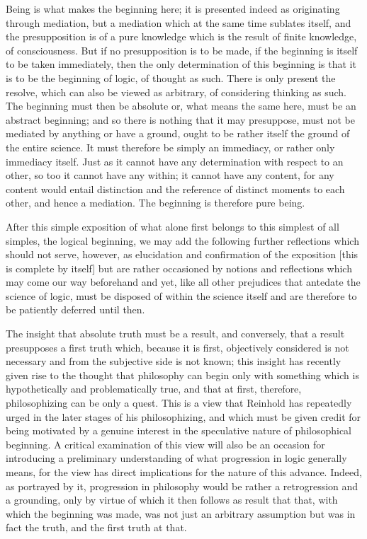 Being is what makes the beginning here;
it is presented indeed as originating through mediation,
but a mediation which at the same time sublates itself,
and the presupposition is of a pure knowledge
which is the result of finite knowledge, of consciousness.
But if no presupposition is to be made,
if the beginning is itself to be taken immediately,
then the only determination of this beginning is
that it is to be the beginning of logic, of thought as such.
There is only present the resolve,
which can also be viewed as arbitrary,
of considering thinking as such.
The beginning must then be absolute
or, what means the same here, must be an abstract beginning;
and so there is nothing that it may presuppose,
must not be mediated by anything or have a ground,
ought to be rather itself the ground of the entire science.
It must therefore be simply an immediacy,
or rather only immediacy itself.
Just as it cannot have any determination with respect to an other,
so too it cannot have any within;
it cannot have any content, for any content would entail distinction
and the reference of distinct moments to each other,
and hence a mediation.
The beginning is therefore pure being.

After this simple exposition of what alone first belongs to
this simplest of all simples, the logical beginning,
we may add the following further reflections which should not serve,
however, as elucidation and confirmation of the exposition
[this is complete by itself]
but are rather occasioned by notions and reflections
which may come our way beforehand and yet,
like all other prejudices that antedate the science of logic,
must be disposed of within the science itself
and are therefore to be patiently deferred until then.

The insight that absolute truth must be a result,
and conversely, that a result presupposes a first truth
which, because it is first, objectively considered is
not necessary and from the subjective side is not known;
this insight has recently given rise to the thought
that philosophy can begin only with something
which is hypothetically and problematically true,
and that at first, therefore, philosophizing can be only a quest.
This is a view that Reinhold has repeatedly urged
in the later stages of his philosophizing,
and which must be given credit for being
motivated by a genuine interest in
the speculative nature of philosophical beginning.
A critical examination of this view will also be
an occasion for introducing a preliminary understanding of
what progression in logic generally means,
for the view has direct implications for the nature of this advance.
Indeed, as portrayed by it, progression in philosophy would be
rather a retrogression and a grounding,
only by virtue of which it then follows as result that
that, with which the beginning was made,
was not just an arbitrary assumption
but was in fact the truth,
and the first truth at that.


